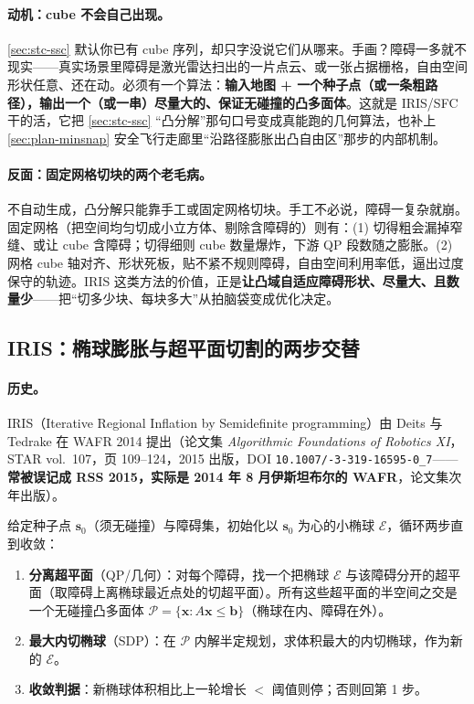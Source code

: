 \paragraph{动机：cube 不会自己出现。}
\cref{sec:stc-ssc} 默认你已有 cube 序列，却只字没说它们从哪来。手画？障碍一多就不现实——真实场景里障碍是激光雷达扫出的一片点云、或一张占据栅格，自由空间形状任意、还在动。必须有一个算法：\textbf{输入地图 + 一个种子点（或一条粗路径），输出一个（或一串）尽量大的、保证无碰撞的凸多面体}。这就是 IRIS/SFC 干的活，它把 \cref{sec:stc-ssc} “凸分解”那句口号变成真能跑的几何算法，也补上 \cref{sec:plan-minsnap} 安全飞行走廊里“沿路径膨胀出凸自由区”那步的内部机制。

\paragraph{反面：固定网格切块的两个老毛病。}
不自动生成，凸分解只能靠手工或固定网格切块。手工不必说，障碍一复杂就崩。固定网格（把空间均匀切成小立方体、剔除含障碍的）则有：(1) 切得粗会漏掉窄缝、或让 cube 含障碍；切得细则 cube 数量爆炸，下游 QP 段数随之膨胀。(2) 网格 cube 轴对齐、形状死板，贴不紧不规则障碍，自由空间利用率低，逼出过度保守的轨迹。IRIS 这类方法的价值，正是\textbf{让凸域自适应障碍形状、尽量大、且数量少}——把“切多少块、每块多大”从拍脑袋变成优化决定。

\subsection{IRIS：椭球膨胀与超平面切割的两步交替}
\label{sec:stc-iris-alg}

\paragraph{历史。}
IRIS（Iterative Regional Inflation by Semidefinite programming）由 Deits 与 Tedrake 在 WAFR 2014 提出\cite{deits2015iris}（论文集 \emph{Algorithmic Foundations of Robotics XI}，STAR vol.\ 107，页 109--124，2015 出版，DOI \texttt{10.1007/-3-319-16595-0\_7}——\textbf{常被误记成 RSS 2015，实际是 2014 年 8 月伊斯坦布尔的 WAFR}，论文集次年出版）。

\begin{algo}\label{alg:stc-iris}
给定种子点 $\mathbf{s}_0$（须无碰撞）与障碍集，初始化以 $\mathbf{s}_0$ 为心的小椭球 $\mathcal{E}$，循环两步直到收敛：
\begin{enumerate}
  \item \textbf{分离超平面}（QP/几何）：对每个障碍，找一个把椭球 $\mathcal{E}$ 与该障碍分开的超平面（取障碍上离椭球最近点处的切超平面）。所有这些超平面的半空间之交是一个无碰撞凸多面体 $\mathcal{P}=\{\mathbf{x}:A\mathbf{x}\le\mathbf{b}\}$（椭球在内、障碍在外）。
  \item \textbf{最大内切椭球}（SDP）：在 $\mathcal{P}$ 内解半定规划，求体积最大的内切椭球，作为新的 $\mathcal{E}$。
  \item \textbf{收敛判据}：新椭球体积相比上一轮增长 $<$ 阈值则停；否则回第 1 步。
\end{enumerate}
\end{algo}

